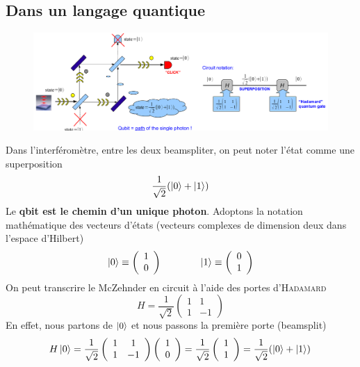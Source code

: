 \subsection{Dans un langage quantique}
	\begin{figure}
	\vspace{-5mm}
	\includegraphics[scale=0.2]{ch1/image7.png}
	\end{figure}
Dans l'interféromètre, entre les deux beamspliter, on peut noter l'état comme une superposition
\begin{equation}
\frac{1}{\sqrt{2}}(\ket0+\ket1)
\end{equation}
Le \textbf{qbit est le chemin d'un unique photon}. Adoptons la notation mathématique des
vecteurs d'états (vecteurs complexes de dimension deux dans l'espace d'Hilbert)
\begin{equation}
\ket0\equiv\left(\begin{array}{c}
1\\
0
\end{array}\right)\qquad\qquad\ket1\equiv\left(\begin{array}{c}
0\\
1
\end{array}\right)
\end{equation}
On peut transcrire le McZehnder en circuit à l'aide des portes d'\textsc{Hadamard}
\begin{equation}
H = \frac{1}{\sqrt{2}}\left(\begin{array}{cc}
1&1\\
1&-1
\end{array}\right)
\end{equation}
En effet, nous partons de $\ket0$ et nous passons la première porte (beamsplit)
\begin{equation}
H\ket0 = \frac{1}{\sqrt{2}}\left(\begin{array}{cc}
1&1\\
1&-1
\end{array}\right)\left(\begin{array}{c}
1\\
0
\end{array}\right)=\frac{1}{\sqrt{2}}\left(\begin{array}{c}
1\\
1
\end{array}\right) = \frac{1}{\sqrt{2}}(\ket0+\ket1)
\end{equation}
